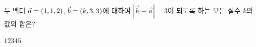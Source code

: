 두 벡터 $\vec{a}=(1{,}\mkern3mu\mathopen{}1{,}\mkern3mu\mathopen{}2)$, $\vec{b}=(k{,}\mkern3mu\mathopen{}3{,}\mkern3mu\mathopen{}3)$에 대하여 $|\vec{b}-\vec{a}|=3$이 되도록 하는 모든 실수 $k$의 값의 합은?
\begin{choices32}{$1$}{$2$}{$3$}{$4$}{$5$}\end{choices32}

